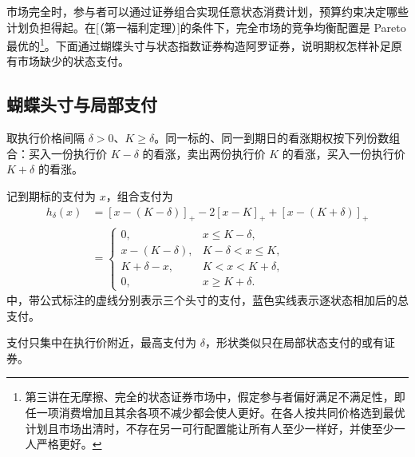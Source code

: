 市场完全时，参与者可以通过证券组合实现任意状态消费计划，预算约束决定哪些计划负担得起。在[（第一福利定理）]的条件下，完全市场的竞争均衡配置是 Pareto 最优的\footnote{第三讲在无摩擦、完全的状态证券市场中，假定参与者偏好满足不满足性，即任一项消费增加且其余各项不减少都会使人更好。在各人按共同价格选到最优计划且市场出清时，不存在另一可行配置能让所有人至少一样好，并使至少一人严格更好。}。下面通过蝴蝶头寸与状态指数证券构造阿罗证券，说明期权怎样补足原有市场缺少的状态支付。

\subsection{蝴蝶头寸与局部支付}
\begin{tcolorbox}[knowledge,title=蝴蝶头寸]
取执行价格间隔 $\delta>0$、$K\ge\delta$。同一标的、同一到期日的看涨期权按下列份数组合：买入一份执行价 $K-\delta$ 的看涨，卖出两份执行价 $K$ 的看涨，买入一份执行价 $K+\delta$ 的看涨。
\end{tcolorbox}
记到期标的支付为 $x$，组合支付为
\[
 \begin{aligned}
 h_\delta(x)&=[x-(K-\delta)]_+-2[x-K]_++[x-(K+\delta)]_+\\
 &=\begin{cases}
 0,&x\le K-\delta,\\
 x-(K-\delta),&K-\delta<x\le K,\\
 K+\delta-x,&K<x<K+\delta,\\
 0,&x\ge K+\delta.
 \end{cases}
 \end{aligned}
\]
 中，带公式标注的虚线分别表示三个头寸的支付，蓝色实线表示逐状态相加后的总支付。
\begin{center}
\begin{minipage}{\linewidth}
%
\centering
{}
\end{minipage}
\end{center}
支付只集中在执行价附近，最高支付为 $\delta$，形状类似只在局部状态支付的或有证券。

